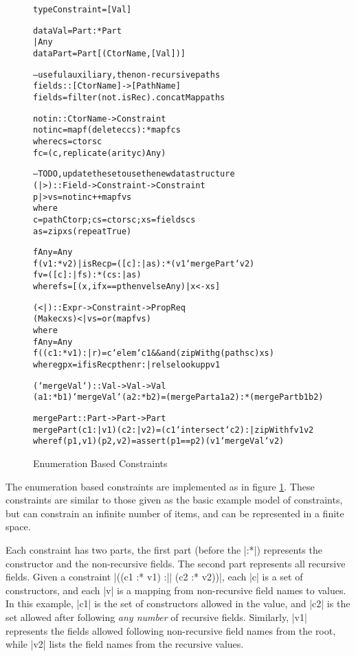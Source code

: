 \documentclass[preprint]{sigplanconf}
\newenvironment{code}{\begin{alltt}\small}{\end{alltt}}
\begin{document}
\begin{figure}
\begin{code}
type Constraint = [Val]

data Val   =  Part :* Part
           |  Any
data Part  =  Part [(CtorName, [Val])]

-- useful auxiliary, the non-recursive paths
fields :: [CtorName] -> [PathName]
fields = filter (not . isRec) . concatMap paths

notin :: CtorName -> Constraint
notin c = map f (delete c cs) :* map f cs
    where  cs = ctors c
           f c = (c, replicate (arity c) Any)

-- TODO, update these to use the new data structure
(|>) :: Field -> Constraint -> Constraint
p |> vs = notin c ++ map f vs
    where
    c = pathCtor p; cs = ctors c; xs = fields cs
    as = zip xs (repeat True)

    f Any = Any
    f (v1 :* v2) | isRec p = ([c] :| as) :* (v1 `mergePart` v2)
    f v = ([c] :| fs) :* (cs :| as)
        where fs = [(x, if x == p then v else Any) |  x <- xs]

(<|) :: Expr -> Constraint -> Prop Req
(Make c xs) <| vs = or (map f vs)
    where
    f Any = Any
    f ((c1 :* v1) :| r) = c `elem` c1 && and (zipWith g (paths c) xs)
        where g p x = if isRec p then r :| r else lookup p v1

(`mergeVal`) :: Val -> Val -> Val
(a1 :* b1) `mergeVal` (a2 :* b2) = (mergePart a1 a2) :* (mergePart b1 b2)

mergePart :: Part -> Part -> Part
mergePart (c1 :| v1) (c2 :| v2) = (c1 `intersect` c2) :| zipWith f v1 v2
    where f (p1,v1) (p2,v2) = assert (p1 == p2) (v1 `mergeVal` v2)
\end{code}
\caption{Enumeration Based Constraints}
\label{fig:enumeration}
\end{figure}

The enumeration based constraints are implemented as in figure \ref{fig:enumeration}. These constraints are similar to those given as the basic example model of constraints, but can constrain an infinite number of items, and can be represented in a finite space.

Each constraint has two parts, the first part (before the |:*|) represents the constructor and the non-recursive fields. The second part represents all recursive fields. Given a constraint |((c1 :* v1) :|| (c2 :* v2))|, each |c| is a set of constructors, and each |v| is a mapping from non-recursive field names to values. In this example, |c1| is the set of constructors allowed in the value, and |c2| is the set allowed after following \textit{any number} of recursive fields. Similarly, |v1| represents the fields allowed following non-recursive field names from the root, while |v2| lists the field names from the recursive values.
\end{document}
